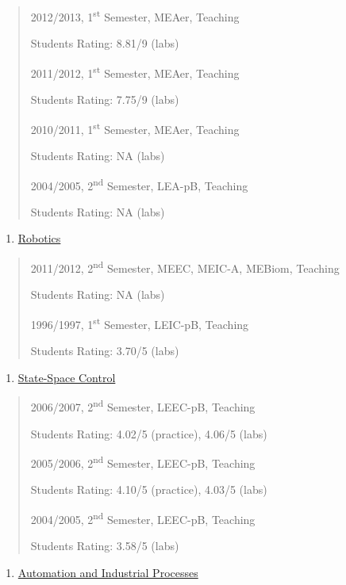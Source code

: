 \begin{quote}
2012/2013, 1\textsuperscript{st} Semester, MEAer, Teaching

Students Rating: 8.81/9 (labs)

2011/2012, 1\textsuperscript{st} Semester, MEAer, Teaching

Students Rating: 7.75/9 (labs)

2010/2011, 1\textsuperscript{st} Semester, MEAer, Teaching

Students Rating: NA (labs)

2004/2005, 2\textsuperscript{nd} Semester, LEA-pB, Teaching

Students Rating: NA (labs)
\end{quote}

\begin{enumerate}
\def\labelenumi{\arabic{enumi}.}
\setcounter{enumi}{7}
\item
  \ul{Robotics}
\end{enumerate}
\begin{quote}
2011/2012, 2\textsuperscript{nd} Semester, MEEC, MEIC-A, MEBiom,
Teaching

Students Rating: NA (labs)

1996/1997, 1\textsuperscript{st} Semester, LEIC-pB, Teaching

Students Rating: 3.70/5 (labs)
\end{quote}

\begin{enumerate}
\def\labelenumi{\arabic{enumi}.}
\setcounter{enumi}{8}
\item
  \ul{State-Space Control}
\end{enumerate}

\begin{quote}
2006/2007, 2\textsuperscript{nd} Semester, LEEC-pB, Teaching

Students Rating: 4.02/5 (practice), 4.06/5 (labs)

2005/2006, 2\textsuperscript{nd} Semester, LEEC-pB, Teaching

Students Rating: 4.10/5 (practice), 4.03/5 (labs)

2004/2005, 2\textsuperscript{nd} Semester, LEEC-pB, Teaching

Students Rating: 3.58/5 (labs)
\end{quote}

\begin{enumerate}
\def\labelenumi{\arabic{enumi}.}
\setcounter{enumi}{9}
\item
  \ul{Automation and Industrial Processes}
\end{enumerate}

